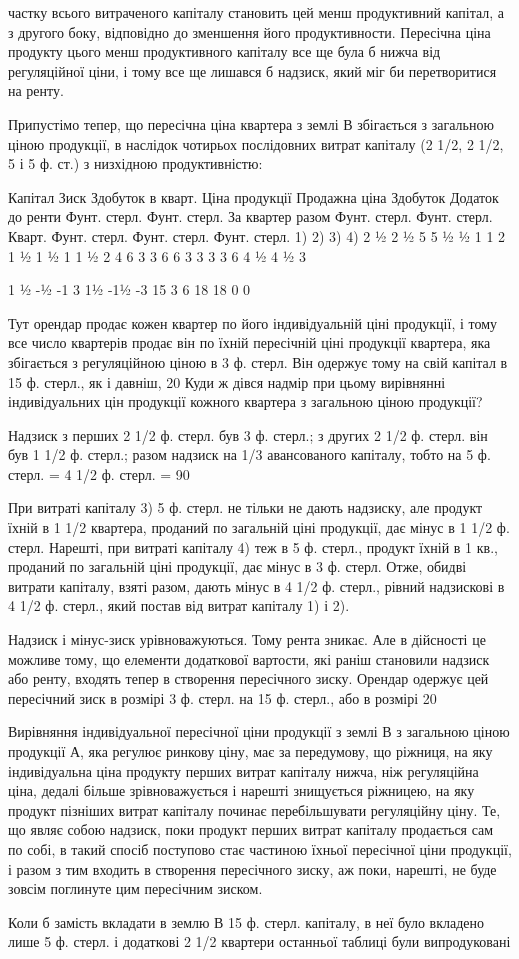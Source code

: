 частку всього витраченого капіталу становить цей менш продуктивний капітал,
а з другого боку, відповідно до зменшення його продуктивности. Пересічна
ціна продукту цього менш продуктивного капіталу все ще була б нижча
від регуляційної ціни, і тому все ще лишався б надзиск, який міг би перетворитися
на ренту.

Припустімо тепер, що пересічна ціна квартера з землі В збігається з загальною
ціною продукції, в наслідок чотирьох послідовних витрат капіталу
(2  1/2, 2  1/2, 5 і 5 ф. ст.) з низхідною продуктивністю:

Капітал Зиск Здобуток в кварт. Ціна продукції Продажна ціна Здобуток Додаток до ренти
 Фунт. стерл. Фунт. стерл.  За квартер разом Фунт. стерл. Фунт. стерл. Кварт. Фунт. стерл.
    Фунт. стерл. Фунт. стерл.
1)
2)
3)
4) 2 ½
2 ½
5
5 ½
½
1
1 2
1 ½
1 ½
1
 1 ½
2
4
6 3
3
6
6 3
3
3
3 6
4 ½
4 ½
3

 1
½
-½
-1
 3
1½
-1½
-3
 15 3 6  18  18 0 0

Тут орендар продає кожен квартер по його індивідуальній ціні продукції,
і тому все число квартерів продає він по їхній пересічній ціні продукції квартера,
яка збігається з регуляційною ціною в 3 ф. стерл. Він одержує тому на свій
капітал в 15 ф. стерл., як і давніш, 20%
Куди ж дівся надмір при цьому вирівнянні індивідуальних цін продукції кожного
квартера з загальною ціною продукції?

Надзиск з перших 2  1/2 ф. стерл. був 3 ф. стерл.; з других 2  1/2 ф. стерл.
він був 1 1/2 ф. стерл.; разом надзиск на  1/3 авансованого капіталу, тобто на
5 ф. стерл. = 4  1/2 ф. стерл. = 90%

При витраті капіталу 3) 5 ф. стерл. не тільки не дають надзиску, але
продукт їхній в 1 1/2 квартера, проданий по загальній ціні продукції, дає мінус в
1  1/2  ф. стерл. Нарешті, при витраті капіталу 4) теж в 5 ф. стерл., продукт
їхній в 1 кв., проданий по загальній ціні продукції, дає мінус в 3 ф. стерл. Отже,
обидві витрати капіталу, взяті разом, дають мінус в 4  1/2 ф. стерл., рівний надзискові
в 4  1/2  ф. стерл., який постав від витрат капіталу 1) і 2).

Надзиск і мінус-зиск урівноважуються. Тому рента зникає. Але в дійсності
це можливе тому, що елементи додаткової вартости, які раніш становили
надзиск або ренту, входять тепер в створення пересічного зиску. Орендар одержує
цей пересічний зиск в розмірі 3 ф. стерл. на 15 ф. стерл., або в розмірі
20%

Вирівняння індивідуальної пересічної ціни продукції з землі В з загальною
ціною продукції А, яка регулює ринкову ціну, має за передумову, що ріжниця,
на яку індивідуальна ціна продукту перших витрат капіталу нижча,
ніж регуляційна ціна, дедалі більше зрівноважується і нарешті знищується
ріжницею, на яку продукт пізніших витрат капіталу починає перебільшувати
регуляційну ціну. Те, що являє собою надзиск, поки продукт перших витрат
капіталу продається сам по собі, в такий спосіб поступово стає частиною їхньої
пересічної ціни продукції, і разом з тим входить в створення пересічного зиску,
аж поки, нарешті, не буде зовсім поглинуте цим пересічним зиском.

Коли б замість вкладати в землю В 15 ф. стерл. капіталу, в неї було вкладено
лише 5 ф. стерл. і додаткові 2  1/2 квартери останньої таблиці були випродуковані
